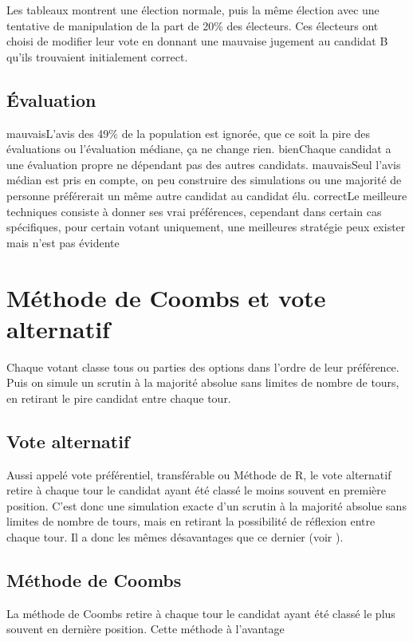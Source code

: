 \documentclass[../report]{subfiles}
\begin{document}
  Les tableaux  montrent une élection normale, puis la même élection avec une tentative
  de manipulation de la part de 20\% des électeurs. 
  Ces électeurs ont choisi de modifier leur vote en donnant une mauvaise jugement au candidat B qu'ils trouvaient 
  initialement correct.

  \subsection{Évaluation}
  \tabcritere%
    {mauvais}{L'avis des 49\% de la population est ignorée, que ce soit la pire des évaluations ou l'évaluation médiane, ça ne change rien.}%
    {bien}{Chaque candidat a une évaluation propre ne dépendant pas des autres candidats.}%
    {mauvais}{Seul l'avis médian est pris en compte, on peu construire des simulations ou une majorité de personne préférerait un même autre candidat au candidat élu.}%
    {correct}{Le meilleure techniques consiste à donner ses vrai préférences, cependant dans certain cas spécifiques, pour certain votant uniquement, une meilleures stratégie peux exister mais n’est pas évidente}

  \section{Méthode de Coombs et vote alternatif}

  Chaque votant classe tous ou parties des options dans l'ordre de leur préférence.
  Puis on simule un scrutin à la majorité absolue sans limites de nombre de tours, en retirant le pire candidat
  entre chaque tour.

  \subsection{Vote alternatif}
  Aussi appelé vote préférentiel, transférable ou Méthode de R, le vote alternatif retire à chaque 
  tour le candidat ayant été classé le moins souvent en première position.
  C'est donc une simulation exacte d'un scrutin à la majorité absolue sans limites de nombre de tours, 
  mais en retirant la possibilité de réflexion entre chaque tour. 
  Il a donc les mêmes désavantages que ce dernier (voir ).

  \subsection{Méthode de Coombs}
  La méthode de Coombs retire à chaque tour le candidat ayant été classé le plus souvent en dernière position.
  Cette méthode à l'avantage 
\end{document}
